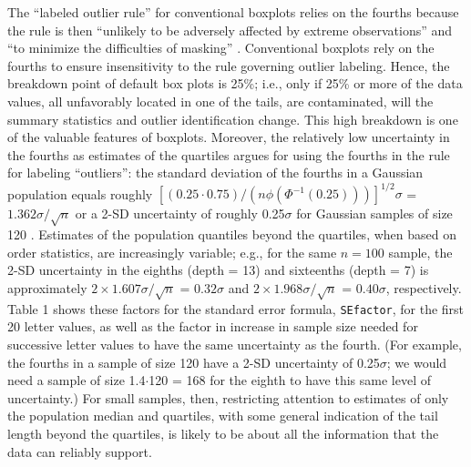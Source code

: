 \documentclass[oneside]{article}
\begin{document}
The ``labeled outlier rule'' for conventional boxplots relies 
on the fourths because the rule is then
``unlikely to be adversely affected by extreme
observations'' and ``to minimize the difficulties of masking'' 
\citep[992]{dchbox}.
Conventional boxplots rely on the fourths to ensure
insensitivity to the rule governing outlier labeling.
Hence, the breakdown point of default box plots is 25\%; 
i.e., only if 25\% or more of the data values, all unfavorably
located in one of the tails, are contaminated,
will the summary statistics and outlier identification change.
This high breakdown is one of the valuable features of boxplots.  
Moreover, the relatively low uncertainty in the fourths as 
estimates of the quartiles argues for using the fourths 
in the rule for labeling ``outliers'': the standard deviation 
of the fourths in a Gaussian population equals roughly 
$[(0.25 \cdot 0.75) / (n  \phi(\Phi^{-1}(0.25)))]^{1/2} \sigma$
= $1.362 \sigma / \sqrt{n}$ 
or a 2-SD uncertainty
of roughly 0.25$\sigma$ for Gaussian samples of size 120 
\citep{ha.order}.
Estimates of the population quantiles beyond the quartiles, when
based on order statistics, are increasingly variable; e.g., for
the same $n = 100$ sample, the 2-SD uncertainty in the eighths
(depth = 13) and sixteenths (depth = 7) is approximately
$ 2 \times 1.607 \sigma / \sqrt{n}$ = $0.32 \sigma$ and
$ 2 \times 1.968 \sigma / \sqrt{n}$ = $0.40 \sigma$, respectively.
Table 1 shows these factors for the standard error formula,
\texttt{SEfactor}, for the first 20 letter values, as well as
the factor in increase in sample size needed for successive
letter values to have the same uncertainty as the fourth.
(For example, the fourths in a sample of size 120 have
a 2-SD uncertainty of 0.25$\sigma$; we would need a sample
of size 1.4$\cdot$120 = 168 for the eighth to have this
same level of uncertainty.)
For small samples, then, restricting attention to estimates of only
the population median and quartiles, with some general indication of 
the tail length beyond the quartiles, is likely to be about all the
information that the data can reliably support.
\end{document}
